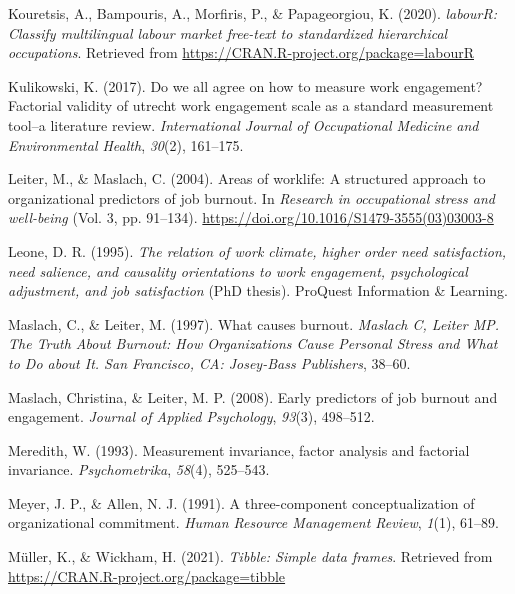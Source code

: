 \documentclass[
  man]{apa7}
\newlength{\cslhangindent}
\newlength{\cslentryspacingunit} %
\newenvironment{CSLReferences}[2] %
 {%
  \setlength{\parindent}{0pt}
  \ifodd #1
  \let\oldpar\par
  \def\par{\hangindent=\cslhangindent\oldpar}
  \fi
  \setlength{\parskip}{#2\cslentryspacingunit}
 }%
 {}
\begin{document}
\begin{CSLReferences}{1}{0}
\leavevmode{}%
Kouretsis, A., Bampouris, A., Morfiris, P., \& Papageorgiou, K. (2020). \emph{labourR: Classify multilingual labour market free-text to standardized hierarchical occupations}. Retrieved from \url{https://CRAN.R-project.org/package=labourR}

\leavevmode{}%
Kulikowski, K. (2017). Do we all agree on how to measure work engagement? Factorial validity of utrecht work engagement scale as a standard measurement tool--a literature review. \emph{International Journal of Occupational Medicine and Environmental Health}, \emph{30}(2), 161--175.

\leavevmode{}%
Leiter, M., \& Maslach, C. (2004). Areas of worklife: A structured approach to organizational predictors of job burnout. In \emph{Research in occupational stress and well-being} (Vol. 3, pp. 91--134). \url{https://doi.org/10.1016/S1479-3555(03)03003-8}

\leavevmode{}%
Leone, D. R. (1995). \emph{The relation of work climate, higher order need satisfaction, need salience, and causality orientations to work engagement, psychological adjustment, and job satisfaction} (PhD thesis). ProQuest Information \& Learning.

\leavevmode{}%
Maslach, C., \& Leiter, M. (1997). What causes burnout. \emph{Maslach C, Leiter MP. The Truth About Burnout: How Organizations Cause Personal Stress and What to Do about It. San Francisco, CA: Josey-Bass Publishers}, 38--60.

\leavevmode{}%
Maslach, Christina, \& Leiter, M. P. (2008). Early predictors of job burnout and engagement. \emph{Journal of Applied Psychology}, \emph{93}(3), 498--512.

\leavevmode{}%
Meredith, W. (1993). Measurement invariance, factor analysis and factorial invariance. \emph{Psychometrika}, \emph{58}(4), 525--543.

\leavevmode{}%
Meyer, J. P., \& Allen, N. J. (1991). A three-component conceptualization of organizational commitment. \emph{Human Resource Management Review}, \emph{1}(1), 61--89.

\leavevmode{}%
Müller, K., \& Wickham, H. (2021). \emph{Tibble: Simple data frames}. Retrieved from \url{https://CRAN.R-project.org/package=tibble}


\end{CSLReferences}
\end{document}
